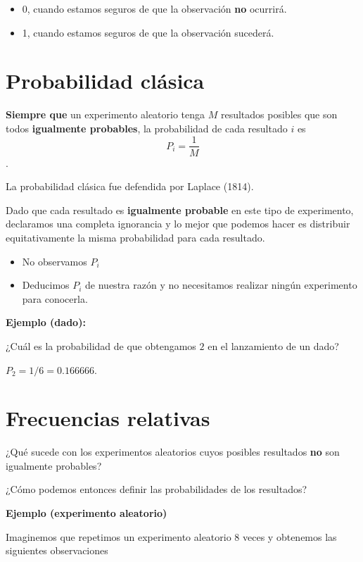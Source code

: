 \documentclass[
]{book}
\providecommand{\tightlist}{%
  \setlength{\itemsep}{0pt}\setlength{\parskip}{0pt}}
\begin{document}
\begin{itemize}
\item
  0, cuando estamos seguros de que la observación \textbf{no} ocurrirá.
\item
  1, cuando estamos seguros de que la observación sucederá.
\end{itemize}

\hypertarget{probabilidad-cluxe1sica}{%
\section{Probabilidad clásica}\label{probabilidad-cluxe1sica}}

\textbf{Siempre que} un experimento aleatorio tenga \(M\) resultados posibles que son todos \textbf{igualmente probables}, la probabilidad de cada resultado \(i\) es \[P_i=\frac{1}{M}\].

La probabilidad clásica fue defendida por Laplace (1814).

Dado que cada resultado es \textbf{igualmente probable} en este tipo de experimento, declaramos una completa ignorancia y lo mejor que podemos hacer es distribuir equitativamente la misma probabilidad para cada resultado.

\begin{itemize}
\tightlist
\item
  No observamos \(P_i\)
\item
  Deducimos \(P_i\) de nuestra razón y no necesitamos realizar ningún experimento para conocerla.
\end{itemize}

\textbf{Ejemplo (dado):}

¿Cuál es la probabilidad de que obtengamos \(2\) en el lanzamiento de un dado?

\(P_2=1/6=0.166666\).

\hypertarget{frecuencias-relativas-1}{%
\section{Frecuencias relativas}\label{frecuencias-relativas-1}}

¿Qué sucede con los experimentos aleatorios cuyos posibles resultados \textbf{no} son igualmente probables?

¿Cómo podemos entonces definir las probabilidades de los resultados?

\textbf{Ejemplo (experimento aleatorio)}

Imaginemos que repetimos un experimento aleatorio \(8\) veces y obtenemos las siguientes observaciones
\end{document}
